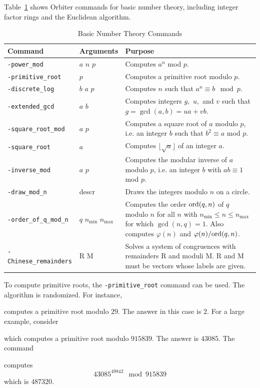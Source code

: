 Table~\ref{tab:basic:number:theory} shows Orbiter commands for basic number theory, 
including integer factor rings and 
the Euclidean algorithm.
\begin{table}
\begin{center}
\begin{tabular}{|p{4cm}|p{3cm}|p{7cm}|}
\hline
Command & Arguments & Purpose \\
\hline
\hline
\verb'-power_mod' & $a$ $n$ $p$ & Computes $a^n$ mod $p$. \\
\hline
		\verb'-primitive_root' & $p$ & Computes a primitive root modulo $p$. \\
		\hline
		\verb'-discrete_log' & $b$ $a$ $p$ & Computes $n$ such that $a^n \equiv b \mod p$. \\
		\hline
		\verb'-extended_gcd' & $a$ $b$ & Computes integers $g,$ $u,$ and $v$ such that $g = \gcd(a,b) = ua + vb.$ \\
		\hline
		\verb'-square_root_mod' & $a$ $p$ & Computes a square root of $a$ modulo $p$, i.e. an integer $b$ such that $b^2 \equiv a$ mod $p$. \\
		\hline
		\verb'-square_root' & $a$ & Computes $\lfloor\sqrt{a}\rfloor$ of an integer $a$. \\
		\hline
		\verb'-inverse_mod' & $a$ $p$ & Computes the modular inverse of $a$ modulo $p$, i.e. an integer $b$ with $ab \equiv 1$ mod $p$. \\
		\hline
		\verb'-draw_mod_n' & descr & Draws the integers modulo $n$ on a circle. \\
		\hline
		\verb'-order_of_q_mod_n' & $q$ $n_{\min}$ $n_{\max}$ & Computes the order ${\rm ord}(q,n)$ 
		of $q$ modulo $n$ for all $n$ with $n_{\min} \le n \le n_{\max}$ 
		for which $\gcd(n,q) = 1$. Also computes $\varphi(n)$ and $\varphi(n)/{\rm ord}(q,n)$. \\
		\hline
		\verb'-Chinese_remainders' & R M & Solves a system of congruences with remainders R and moduli M. R and M must be vectors whose labels are given. \\
		\hline
\end{tabular}
\end{center}
\caption{\label{tab:basic:number:theory}Basic Number Theory Commands}
\end{table}


To compute primitive roots, the \verb'-primitive_root' command can be used.
The algorithm is randomized. 
For instance,  
{\tt

}
computes a primitive root modulo $29$. The answer in this case is $2.$
For a large example, consider
{\tt

}
which computes a primitive root modulo $915839$. The answer is $43085$.
The command 
{\tt

}
computes 
$$
43085^{49842} \mod 915839
$$
which is $487320$.

